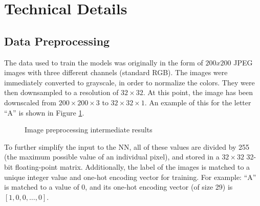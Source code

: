 \documentclass[10pt,Times New Roman]{article}
\begin{document}
\section{Technical Details}
    \subsection{Data Preprocessing}
    The data used to train the models was originally in the form of $200x200$ JPEG images with 
    three different channels (standard RGB). The images were immediately converted to grayscale, 
    in order to normalize the colors. They were then downsampled to a resolution of $32 \times 32$. At 
    this point, the image has been downscaled from $200 \times 200 \times 3$ to $32 \times 32 \times 1$. 
    An example of this for the letter ``A'' is shown in Figure \ref{fig:a_images}.
 
    \begin{figure}[h]
        \caption{Image preprocessing intermediate results}
        \label{fig:a_images}
    \end{figure}
    
    To further simplify the input to the NN, all of these values are divided
    by 255 (the maximum possible value of an individual pixel), and stored in a $32 \times 32$ 
    32-bit floating-point matrix. Additionally, the label of the images is matched to a unique 
    integer value and one-hot encoding vector for training. For example: ``A'' is matched to a value
    of 0, and its one-hot encoding vector (of size 29) is $[1,0,0,\ldots,0]$.
\end{document}
